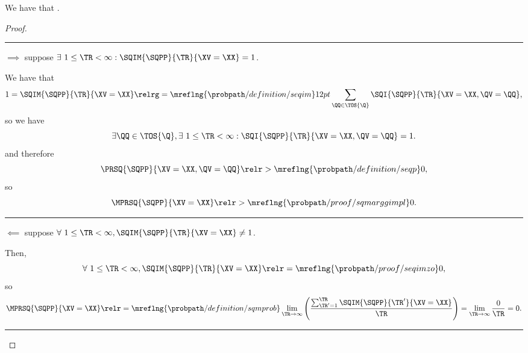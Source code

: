 \begin{proposition}
  We have that \sequimimplprop.%
\end{proposition}

\begin{proof}
  \hrule
  $\implies$ suppose $\exists\ 1 \le \TR < \infty : \SQIM{\SQPP}{\TR}{\XV = \XX} = 1$.

  We have that
  $$1 = \SQIM{\SQPP}{\TR}{\XV = \XX} 
  \relrg = {\mreflng{\probpath/definition/seqim}} 12pt
  \sum_{\QQ \in \TOS{\Q}}
  \SQI{\SQPP}{\TR}{\XV = \XX, \QV = \QQ},$$
  so we have
  $$\exists \QQ \in \TOS{\Q}, \exists\ 1 \le \TR < \infty : \SQI{\SQPP}{\TR}{\XV = \XX, \QV = \QQ} = 1.$$
  and therefore
  $$
  \PRSQ{\SQPP}{\XV = \XX, \QV = \QQ}
  \relr > {\mreflng{\probpath/definition/seqp}} 
  0,
  $$
  so
  $$
  \MPRSQ{\SQPP}{\XV = \XX}
  \relr > {\mreflng{\probpath/proof/sqmarggimpl}} 
  0.
  $$
  \hrule
  $\impliedby$ suppose $\forall \ 1 \le \TR < \infty, \SQIM{\SQPP}{\TR}{\XV = \XX} \ne 1$.

  Then, $$\forall \ 1 \le \TR < \infty, \SQIM{\SQPP}{\TR}{\XV = \XX} \relr = {\mreflng{\probpath/proof/seqimzo}} 0,$$
  so
  $$\MPRSQ{\SQPP}{\XV=\XX} 
  \relr = {\mreflng{\probpath/definition/sqmprob}} 
  \lim_{\TR \rightarrow \infty}\left(\frac{\sum_{\TR' = 1}^{\TR}\SQIM{\SQPP}{\TR'}{\XV = \XX}}{\TR}\right)
  =
  \lim_{\TR \rightarrow \infty}\frac{0}{\TR} = 0.
  $$
  \hrule
\end{proof}
